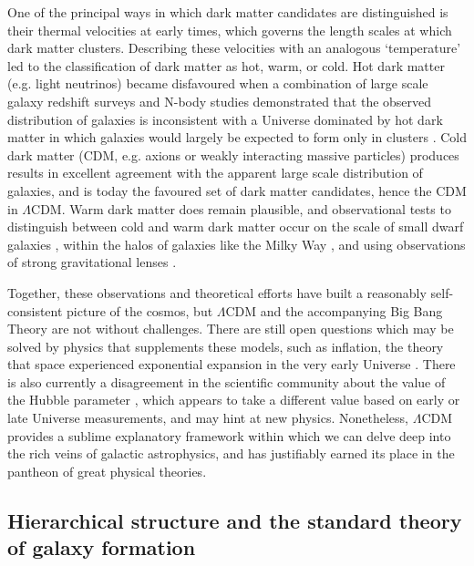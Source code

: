 One of the principal ways in which dark matter candidates are distinguished is their thermal velocities at early times, which governs the length scales at which dark matter clusters. Describing these velocities with an analogous `temperature' led to the classification of dark matter as hot, warm, or cold. Hot dark matter (e.g. light neutrinos) became disfavoured when a combination of large scale galaxy redshift surveys and N-body studies demonstrated that the observed distribution of galaxies is inconsistent with a Universe dominated by hot dark matter in which galaxies would largely be expected to form only in clusters \parencite{white83}. Cold dark matter (CDM, e.g. axions or weakly interacting massive particles) produces results in excellent agreement with the apparent large scale distribution of galaxies, and is today the favoured set of dark matter candidates, hence the CDM in $\Lambda$CDM. Warm dark matter does remain plausible, and observational tests to distinguish between cold and warm dark matter occur on the scale of small dwarf galaxies \parencite[e.g.][]{nadler19}, within the halos of galaxies like the Milky Way \parencite[e.g.][]{banik21}, and using observations of strong gravitational lenses \parencite[e.g.][]{gilman20}.

Together, these observations and theoretical efforts have built a reasonably self-consistent picture of the cosmos, but $\Lambda$CDM and the accompanying Big Bang Theory are not without challenges. There are still open questions which may be solved by physics that supplements these models, such as inflation, the theory that space experienced exponential expansion in the very early Universe \parencite{guth81,linde82}. There is also currently a disagreement in the scientific community about the value of the Hubble parameter \parencite[see][]{divalentino21}, which appears to take a different value based on early or late Universe measurements, and may hint at new physics. Nonetheless, $\Lambda$CDM provides a sublime explanatory framework within which we can delve deep into the rich veins of galactic astrophysics, and has justifiably earned its place in the pantheon of great physical theories.

\subsection{Hierarchical structure and the standard theory of galaxy formation}

